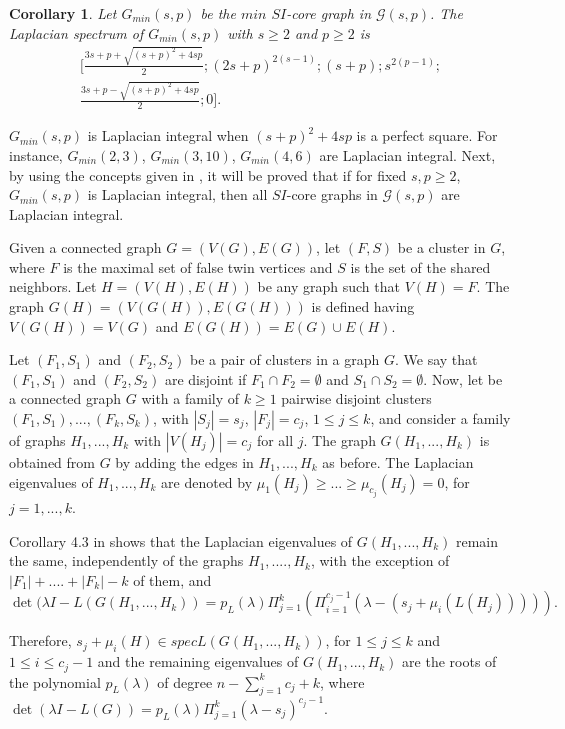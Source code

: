 \documentclass[preprint,12pt]{elsarticle}
\newtheorem{corollary}{Corollary}[theorem]
\begin{document}
\begin{corollary}\label{cor:valuesGmin}
Let $G_{min}(s,p)$ be the $min$ $SI$-core graph in $\mathcal{G}(s,p)$. 
The Laplacian spectrum of $G_{min}(s,p)$ with $s \geq 2$ and $p \geq 2$ is
\[
\begin{aligned}
\bigg[  \frac{3s+p  +\sqrt{(s+p)^2 + 4sp}}{2};( 2s+p)^{2(s-1)};(s+p); s^{2(p-1)};\\
\frac{3s+p - \sqrt{(s+p)^2 + 4sp}}{2};0\bigg].
\end{aligned}
\]

\end{corollary}

$G_{min}(s,p)$ is Laplacian integral when $(s+p)^2 + 4sp$ is a perfect square. For instance, $G_{min}(2,3)$, $G_{min}(3,10)$, $G_{min}(4,6)$ are Laplacian integral.  Next, by using the concepts given in \cite{CR17}, it will be proved that if for fixed $s,p \geq 2$, $G_{min}(s,p)$ is Laplacian integral, then all $SI$-core graphs in $\mathcal{G}(s,p)$ are Laplacian integral.


Given a connected graph $G=(V(G), E(G))$, let $(F, S)$ be a cluster in $G$, 
where $F$ is the maximal set of false twin vertices and $S$ is the set of the shared neighbors. 
Let $H=(V(H), E(H))$ be any graph such that  $V(H) = F$. 
The graph $G(H) = (V(G(H)), E(G(H)))$ is defined having $V(G(H)) = V(G)$ and $E(G(H)) = E(G) \cup E(H)$.

Let $(F_1,S_1)$ and $(F_2,S_2)$ be a pair of  clusters in a graph $G$.  We say that $(F_1,S_1)$ and $(F_2,S_2)$ are disjoint if $F_1 \cap F_2 = \emptyset$ and $S_1 \cap S_2 = \emptyset$. 
Now, let be a connected graph $G$ with a family of $k \geq 1$ pairwise disjoint clusters $(F_1, S_1), ..., (F_k, S_k)$, with $|S_j|= s_j$, $|F_j| = c_j$, $1 \leq j \leq k$,  and consider a family of graphs $H_1, ..., H_k$ with $|V(H_j)| = c_j$ for all $j$. The graph $G(H_1, ..., H_k)$ is obtained from $G$ by adding the edges in  $H_1, ..., H_k$ as before.
The Laplacian eigenvalues of $H_1, ..., H_k$ are denoted by  $\mu_1(H_j) \geq ...\geq \mu_{c_{j}} (H_j) = 0$, for $ j=1, ..., k$. 


Corollary 4.3 in \cite{CR17} shows that the Laplacian eigenvalues of $G(H_1, ..., H_k)$ remain the same, independently of the graphs $H_1, ...., H_k$, with the exception of $|F_1| +.... +|F_k| - k$ of them, and 
$$ \det(\lambda I - L(G(H_1, ..., H_k)) = p_L(\lambda) \Pi_{j=1}^{k}(\Pi_{i=1}^{c_j-1} (\lambda - (s_j + \mu_i(L(H_j))))  ). $$

Therefore, 
$s_j + \mu_i(H) \in specL(G(H_1, ..., H_k))$, for $1 \leq j \leq k$ and $1 \leq i \leq c_j-1$ 
and the remaining eigenvalues of $G(H_1, ..., H_k)$ are the roots of the polynomial $p_L(\lambda)$ 
of degree  $n-\sum_{j=1}^{k} c_j  + k$, where $ \det(\lambda I - L(G)) = p_L(\lambda) \Pi_{j=1}^{k} (\lambda - s_j)^{c_j-1}$. \newline
\end{document}
